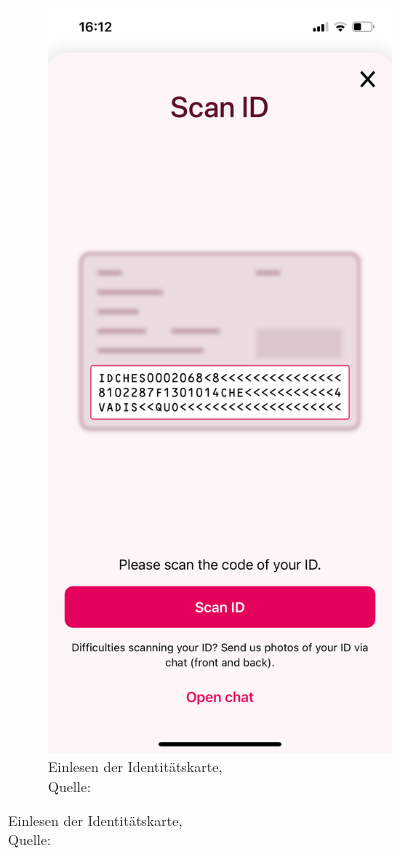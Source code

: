 \begin{figure}[h]
	\begin{subfigure}[b]{0.4\textwidth}
		\includegraphics[scale=0.15]{images/ID-Scan.PNG}
		\caption[Einlesen der Identitätskarte]{Einlesen der Identitätskarte,\\ Quelle: \cite{avecApp}}

\end{subfigure}
\end{figure}
